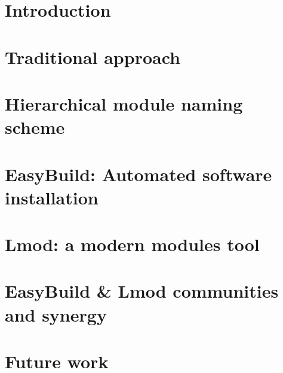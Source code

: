 \documentclass[conference, compsocconf]{IEEEtran}
\newcommand{\easybuild}{EasyBuild}
\begin{document}
%
\IEEEpeerreviewmaketitle



\section{Introduction}\label{sec:intro}


\section{Traditional approach}
\label{sec:traditional}


\section{Hierarchical module naming scheme}
\label{sec:hierarchical}


\section{\easybuild{}: Automated software installation}
\label{sec:easybuild}


\section{Lmod: a modern modules tool}
\label{sec:lmod}


%

\section{EasyBuild \& Lmod communities and synergy}
\label{sec:communities_synergy}


\section{Future work}
\label{sec:future_work}

\end{document}
